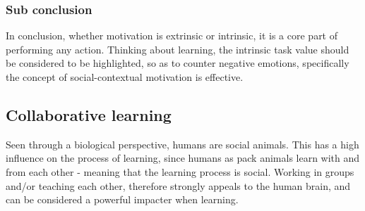 \subsubsection*{Sub conclusion}
In conclusion, whether motivation is extrinsic or intrinsic, it is a core part of performing any action. Thinking about learning, the intrinsic task value should be considered to be highlighted, so as to counter negative emotions, specifically the concept of social-contextual motivation is effective.

\subsection{Collaborative learning}\label{collabLearning}
 Seen through a biological perspective, humans are social animals\cite{laeringIPraksis}. This has a high influence on the process of learning, since humans as pack animals learn with and from each other - meaning that the learning process is social\cite{laeringIPraksis}. Working in groups and/or teaching each other, therefore strongly appeals to the human brain, and can be considered a powerful impacter when learning\cite{laeringIPraksis}.        

